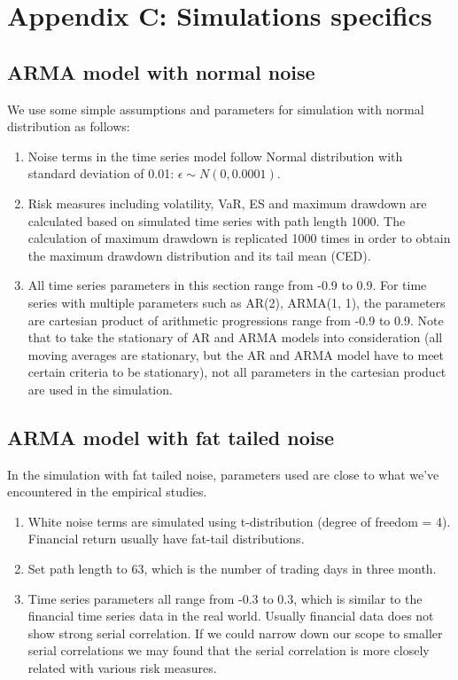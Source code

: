 \documentclass[11pt]{article}
\begin{document}
\section{Appendix C: Simulations specifics} \label{App:AppendixC}
\subsection{ARMA model with normal noise}

We use some simple assumptions and parameters for simulation with normal distribution as follows:

\begin{enumerate}
\item Noise terms in the time series model follow Normal distribution with standard deviation of 0.01: $\epsilon \sim N(0, 0.0001)$.
\item Risk measures including volatility, VaR, ES and maximum drawdown are calculated based on simulated time series with path length 1000. The calculation of maximum drawdown is replicated 1000 times in order to obtain the maximum drawdown distribution and its tail mean (CED).
\item All time series parameters in this section range from -0.9 to 0.9. For time series with multiple parameters such as AR(2), ARMA(1, 1), the parameters are cartesian product of arithmetic progressions range from -0.9 to 0.9. Note that to take the stationary of AR and ARMA models into consideration (all moving averages are stationary, but the AR and ARMA model have to meet certain criteria to be stationary), not all parameters in the cartesian product are used in the simulation.
\end{enumerate}

\subsection{ARMA model with fat tailed noise}

In the simulation with fat tailed noise, parameters used are close to what we've encountered in the empirical studies. 

\begin{enumerate}
\item White noise terms are simulated using t-distribution (degree of freedom = 4). Financial return usually have fat-tail distributions.
\item Set path length to 63, which is the number of trading days in three month.
\item Time series parameters all range from -0.3 to 0.3, which is similar to the financial time series data in the real world. Usually financial data does not show strong serial correlation. If we could narrow down our scope to smaller serial correlations we may found that the serial correlation is more closely related with various risk measures.
\end{enumerate}
\end{document}
